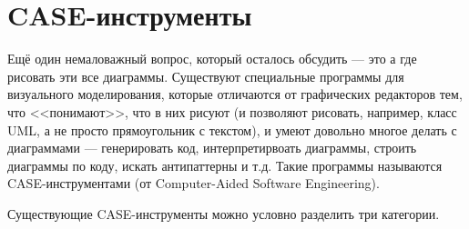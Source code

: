 \documentclass[a5paper]{article}
\begin{document}
\section{CASE-инструменты}

Ещё один немаловажный вопрос, который осталось обсудить --- это а где рисовать эти все диаграммы. Существуют специальные программы для визуального моделирования, которые отличаются от графических редакторов тем, что <<понимают>>, что в них рисуют (и позволяют рисовать, например, класс UML, а не просто прямоугольник с текстом), и умеют довольно многое делать с диаграммами --- генерировать код, интерпретирвоать диаграммы, строить диаграммы по коду, искать антипаттерны и т.д. Такие программы называются CASE-инструментами (от Computer-Aided Software Engineering).

Существующие CASE-инструменты можно условно разделить три категории.
\end{document}
